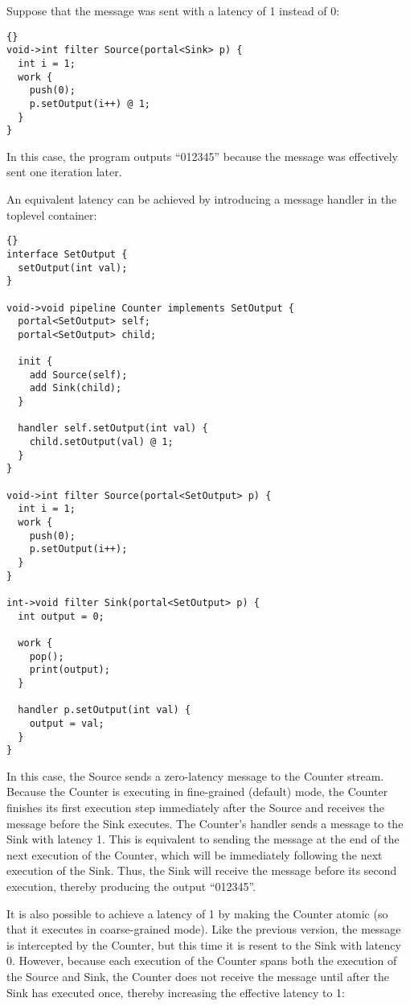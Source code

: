 Suppose that the message was sent with a latency of 1 instead of 0:

\begin{lstlisting}{}
void->int filter Source(portal<Sink> p) {
  int i = 1;
  work {
    push(0);
    p.setOutput(i++) @ 1;
  }
}
\end{lstlisting}{}

In this case, the program outputs ``012345'' because the message was
effectively sent one iteration later.

An equivalent latency can be achieved by introducing a message handler
in the toplevel container:

\begin{lstlisting}{}
interface SetOutput {
  setOutput(int val);
}

void->void pipeline Counter implements SetOutput {
  portal<SetOutput> self;
  portal<SetOutput> child;

  init {
    add Source(self);
    add Sink(child);
  }

  handler self.setOutput(int val) {
    child.setOutput(val) @ 1;
  }
}

void->int filter Source(portal<SetOutput> p) {
  int i = 1;
  work {
    push(0);
    p.setOutput(i++);
  }
}

int->void filter Sink(portal<SetOutput> p) {
  int output = 0;

  work {
    pop();
    print(output);
  }

  handler p.setOutput(int val) {
    output = val;
  }
}
\end{lstlisting}{}

In this case, the Source sends a zero-latency message to the Counter
stream.  Because the Counter is executing in fine-grained (default)
mode, the Counter finishes its first execution step immediately after
the Source and receives the message before the Sink executes.  The
Counter's handler sends a message to the Sink with latency 1.  This is
equivalent to sending the message at the end of the next execution of
the Counter, which will be immediately following the next execution of
the Sink.  Thus, the Sink will receive the message before its second
execution, thereby producing the output ``012345''.

It is also possible to achieve a latency of 1 by making the Counter
atomic (so that it executes in coarse-grained mode).  Like the
previous version, the message is intercepted by the Counter, but this
time it is resent to the Sink with latency 0.  However, because each
execution of the Counter spans both the execution of the Source and
Sink, the Counter does not receive the message until after the Sink
has executed once, thereby increasing the effective latency to 1:

